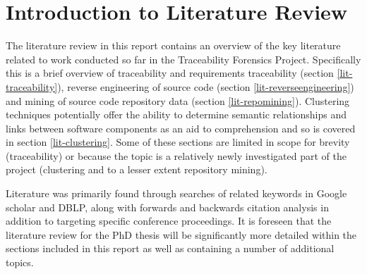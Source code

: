 \section{Introduction to Literature Review}\label{lit-introduction}

The literature review in this report contains an overview of the key literature related to work conducted so far in the Traceability Forensics Project. Specifically this is a brief overview of traceability and requirements traceability (section \ref{lit-traceability}), reverse engineering of source code (section \ref{lit-reverseengineering}) and mining of source code repository data (section \ref{lit-repomining}). Clustering techniques potentially offer the ability to determine semantic relationships and links between software components as an aid to comprehension and so is covered in section \ref{lit-clustering}. Some of these sections are limited in scope for brevity (traceability) or because the topic is a relatively newly investigated part of the project (clustering and to a lesser extent repository mining). 


Literature was primarily found through searches of related keywords in Google scholar and DBLP, along with forwards and backwards citation analysis in addition to targeting specific conference proceedings. It is foreseen that the literature review for the PhD thesis will be significantly more detailed within the sections included in this report as well as containing a number of additional topics.